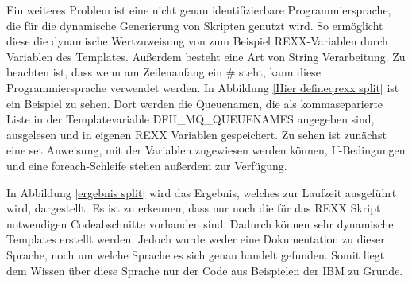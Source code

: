 Ein weiteres Problem ist eine nicht genau identifizierbare Programmiersprache, die für die dynamische Generierung von Skripten genutzt wird.
So ermöglicht diese die dynamische Wertzuweisung von zum Beispiel REXX-Variablen durch Variablen des Templates.
Außerdem besteht eine Art von String Verarbeitung.
Zu beachten ist, dass wenn am Zeilenanfang ein \glqq\#\grqq{} steht, kann diese Programmiersprache verwendet werden.
In Abbildung \ref{Hier defineqrexx split} ist ein Beispiel zu sehen.
Dort werden die Queuenamen, die als kommaseparierte Liste in der Templatevariable \glqq DFH\_MQ\_QUEUENAMES\grqq{} angegeben sind, ausgelesen und in eigenen REXX Variablen gespeichert.
Zu sehen ist zunächst eine \glqq set\grqq{} Anweisung, mit der Variablen zugewiesen werden können, If-Bedingungen und eine foreach-Schleife stehen außerdem zur Verfügung.

In Abbildung \ref{ergebnis split} wird das Ergebnis, welches zur Laufzeit ausgeführt wird, dargestellt.
Es ist zu erkennen, dass nur noch die für das REXX Skript notwendigen Codeabschnitte vorhanden sind.
Dadurch können sehr dynamische Templates erstellt werden.
Jedoch wurde weder eine Dokumentation zu dieser Sprache, noch um welche Sprache es sich genau handelt gefunden.
Somit liegt dem Wissen über diese Sprache nur der Code aus Beispielen der IBM zu Grunde.

